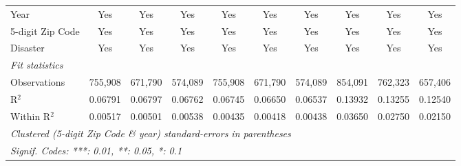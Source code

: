 \begin{tabular}{lccccccccc}
   Year                                                       & Yes            & Yes            & Yes           & Yes           & Yes            & Yes           & Yes           & Yes           & Yes\\  
   5-digit Zip Code                                           & Yes            & Yes            & Yes           & Yes           & Yes            & Yes           & Yes           & Yes           & Yes\\  
   Disaster                                                   & Yes            & Yes            & Yes           & Yes           & Yes            & Yes           & Yes           & Yes           & Yes\\  
   \midrule
   \emph{Fit statistics}\\
   Observations                                               & 755,908        & 671,790        & 574,089       & 755,908       & 671,790        & 574,089       & 854,091       & 762,323       & 657,406\\  
   R$^2$                                                      & 0.06791        & 0.06797        & 0.06762       & 0.06745       & 0.06650        & 0.06537       & 0.13932       & 0.13255       & 0.12540\\  
   Within R$^2$                                               & 0.00517        & 0.00501        & 0.00538       & 0.00435       & 0.00418        & 0.00438       & 0.03650       & 0.02750       & 0.02150\\  
   \midrule \midrule
   \multicolumn{10}{l}{\emph{Clustered (5-digit Zip Code \& year) standard-errors in parentheses}}\\
   \multicolumn{10}{l}{\emph{Signif. Codes: ***: 0.01, **: 0.05, *: 0.1}}\\
\end{tabular}
\par\endgroup
